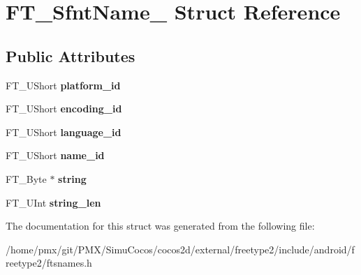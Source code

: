 \hypertarget{structFT__SfntName__}{}\section{F\+T\+\_\+\+Sfnt\+Name\+\_\+ Struct Reference}
\label{structFT__SfntName__}
\subsection*{Public Attributes}
\begin{DoxyCompactItemize}
\item 
\mbox{\label{structFT__SfntName___ae92450a058eb4737df85f66226d69f43}} 
F\+T\+\_\+\+U\+Short {\bfseries platform\+\_\+id}
\item 
\mbox{\label{structFT__SfntName___a01f4573605eab3f4d2e4b9b50b0de98f}} 
F\+T\+\_\+\+U\+Short {\bfseries encoding\+\_\+id}
\item 
\mbox{\label{structFT__SfntName___a6fb23e0f299a97b25b63805b04cf1fc5}} 
F\+T\+\_\+\+U\+Short {\bfseries language\+\_\+id}
\item 
\mbox{\label{structFT__SfntName___ac07be3e852408990fe0a910f00b68f4e}} 
F\+T\+\_\+\+U\+Short {\bfseries name\+\_\+id}
\item 
\mbox{\label{structFT__SfntName___ac8b9bbfc8fc5352981fb3660b2357ef0}} 
F\+T\+\_\+\+Byte $\ast$ {\bfseries string}
\item 
\mbox{\label{structFT__SfntName___a4ebdb7207b5681d16f9cc17f432cb56f}} 
F\+T\+\_\+\+U\+Int {\bfseries string\+\_\+len}
\end{DoxyCompactItemize}


The documentation for this struct was generated from the following file\+:\begin{DoxyCompactItemize}
\item 
/home/pmx/git/\+P\+M\+X/\+Simu\+Cocos/cocos2d/external/freetype2/include/android/freetype2/ftsnames.\+h\end{DoxyCompactItemize}
